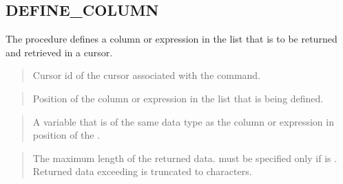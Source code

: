 \documentclass[letterpaper,10pt,english,openany,oneside]{sphinxmanual}
\begin{document}
\newpage


\subsection{DEFINE\_COLUMN}
\label{\detokenize{define_column:define-column}}\label{\detokenize{define_column::doc}}
The  procedure defines a column or expression in the
 list that is to be returned and retrieved in a cursor.

\begin{quote}


\end{quote}


\begin{quote}

Cursor id of the cursor associated with the  command.
\end{quote}

\begin{quote}

Position of the column or expression in the  list that is being
defined.
\end{quote}

\begin{quote}

A variable that is of the same data type as the column or expression in
position  of the .
\end{quote}

\begin{quote}

The maximum length of the returned data.  must be
specified only if  is . Returned data exceeding
 is truncated to  characters.
\end{quote}
\end{document}
